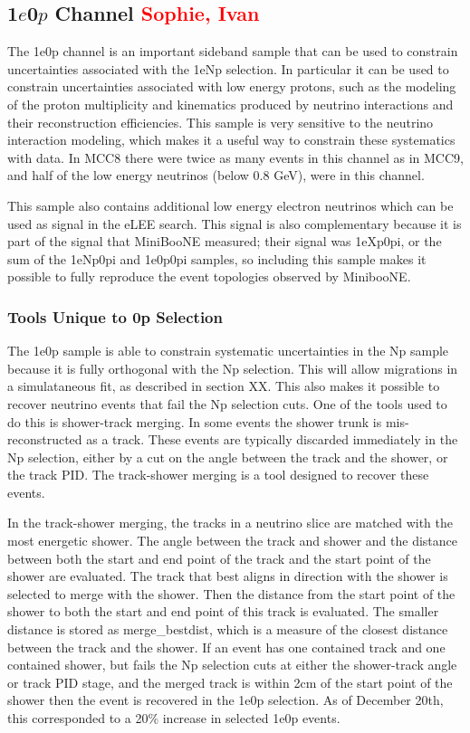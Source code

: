\documentclass[a4paper]{article}
\begin{document}
\subsection{1$e$0$p$ Channel \textcolor{red}{Sophie, Ivan}}
\label{sec:nueselection:1e0p}
The 1e0p channel is an important sideband sample that can be used to constrain uncertainties associated with the 1eNp selection.  In particular it can be used to constrain uncertainties associated with low energy protons, such as the modeling of the proton multiplicity and kinematics produced by neutrino interactions and their reconstruction efficiencies.  This sample is very sensitive to the neutrino interaction modeling, which makes it a useful way to constrain these systematics with data.  In MCC8 there were twice as many events in this channel as in MCC9, and half of the low energy neutrinos (below 0.8 GeV), were in this channel.

This sample also contains additional low energy electron neutrinos which can be used as signal in the eLEE search.  This signal is also complementary because it is part of the signal that MiniBooNE measured; their signal was 1eXp0pi, or the sum of the 1eNp0pi and 1e0p0pi samples, so including this sample makes it possible to fully reproduce the event topologies observed by MinibooNE.    

\subsubsection{Tools Unique to 0p Selection}

The 1e0p sample is able to constrain systematic uncertainties in the Np sample because it is fully orthogonal with the Np selection.  This will allow migrations in a simulataneous fit, as described in section XX.  This also makes it possible to recover neutrino events that fail the Np selection cuts.  One of the tools used to do this is shower-track merging.  In some events the shower trunk is mis-reconstructed as a track.  These events are typically discarded immediately in the Np selection, either by a cut on the angle between the track and the shower, or the track PID.  The track-shower merging is a tool designed to recover these events.

In the track-shower merging, the tracks in a neutrino slice are matched with the most energetic shower.  The angle between the track and shower and the distance between both the start and end point of the track and the start point of the shower are evaluated.  The track that best aligns in direction with the shower is selected to merge with the shower.  Then the distance from the start point of the shower to both the start and end point of this track is evaluated.  The smaller distance is stored as merge\_bestdist, which is a measure of the closest distance between the track and the shower. If an event has one contained track and one contained shower, but fails the Np selection cuts at either the shower-track angle or track PID stage, and the merged track is within 2cm of the start point of the shower then the event is recovered in the 1e0p selection.  As of December 20th, this corresponded to a 20\% increase in selected 1e0p events.
\end{document}
